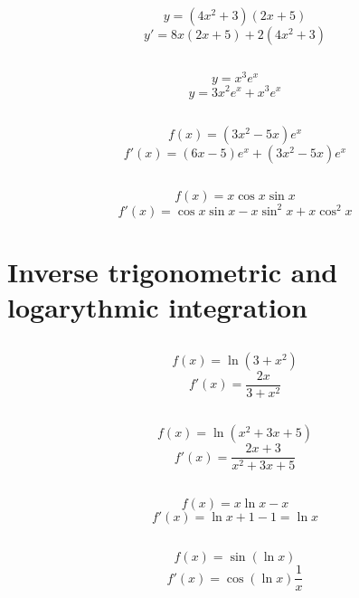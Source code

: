 \documentclass[11pt,oneside,titlepage]{book}
\begin{document}
$$ y = (4x^2 + 3)(2x + 5) $$
$$ y' = 8x(2x + 5) + 2(4x^2 + 3) $$

\subsection{}

$$y = x^3 e^x $$
$$y = 3x^2 e^x + x^3 e^x$$

\subsection{}

$$f(x) = (3x^2 - 5x) e^x$$
$$f'(x) = (6x - 5) e^x + (3x^2 - 5x) e^x$$

\subsection{}

$$f(x) = x \cos x \sin x$$
$$f'(x) =  \cos x \sin x - x \sin^2 x + x \cos^2 x$$

\section{Inverse trigonometric and logarythmic integration}

\subsection{}

$$f(x) = \ln(3 + x^2)$$
$$f'(x) = \frac{2x}{3 + x^2}$$

\subsection{}

$$f(x) = \ln (x^2 + 3x + 5)$$
$$f'(x) = \frac{2x + 3}{x^2 + 3x + 5}$$

\subsection{}

$$f(x) = x \ln x - x$$
$$f'(x) = \ln x + 1 - 1 = \ln x$$

\subsection{}

$$f(x) = \sin  (\ln x)$$
$$f'(x) = \cos (\ln x) \frac 1 x$$

\subsection{}
\end{document}
